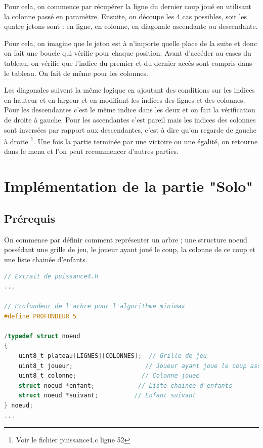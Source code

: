 \documentclass[a4paper,fleqn]{article}
\begin{document}
Pour cela, on commence par récupérer la ligne du dernier coup joué en utilisant la colonne passé en paramètre. Ensuite, on découpe les 4 cas possibles, soit les quatre jetons sont : en ligne, en colonne, en diagonale ascendante ou descendante.

Pour cela, on imagine que le jeton est à n'importe quelle place de la suite et donc on fait une boucle qui vérifie pour chaque position. Avant d'accéder au cases du tableau, on vérifie que l'indice du premier et du dernier accès sont compris dans le tableau. On fait de même pour les colonnes.

Les diagonales suivent la même logique en ajoutant des conditions sur les indices en hauteur et en largeur et en modifiant les indices des lignes et des colonnes. Pour les descendantes c'est le même indice dans les deux et on fait la vérification de droite à gauche. Pour les ascendantes c'est pareil mais les indices des colonnes sont inversées par rapport aux descendantes, c'est à dire qu'on regarde de gauche à droite \footnote{Voir le fichier puissance4.c ligne 52}. Une fois la partie terminée par une victoire ou une égalité, on retourne dans le menu et l'on peut recommencer d'autres parties.

\pagebreak

\section{Implémentation de la partie "Solo"}

\subsection{Prérequis}

On commence par définir comment représenter un arbre ; une structure noeud possédant une grille de jeu, le joueur ayant joué le coup, la colonne de ce coup et une liste chainée d'enfants. \\

\begin{lstlisting}[language=C, caption=Représentation d'un noeud en C]
// Extrait de puissance4.h
...

// Profondeur de l'arbre pour l'algorithme minimax
#define PROFONDEUR 5

/typedef struct noeud
{
    uint8_t plateau[LIGNES][COLONNES];  // Grille de jeu
    uint8_t joueur;                    // Joueur ayant joue le coup associe au noeud
    uint8_t colonne;                  // Colonne jouee
    struct noeud *enfant;            // Liste chainee d'enfants
    struct noeud *suivant;          // Enfant suivant
} noeud;
...

\end{lstlisting}
\end{document}
